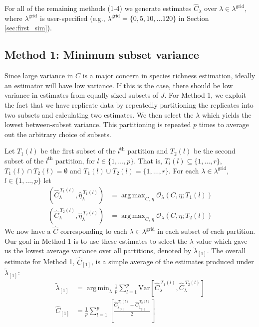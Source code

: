 \documentclass[12pt]{article}
\DeclareMathOperator*{\argmin}{arg\,min}
\DeclareMathOperator*{\argmax}{arg\,max}
\newcommand{\lambdagrid}{\lambda^{\text{grid}}}
\theoremstyle{break}
\theoremstyle{break}
\begin{document}
For all of the remaining methods (1-4) we generate estimates $\widehat{C}_\lambda$ over $\lambda \in \lambda^{\text{grid}}$, where $\lambdagrid$ is user-specified (e.g., $\lambdagrid = \{0, 5, 10, \dots 120\}$ in Section \ref{sec:first_sim}).  %

%
%
\subsection{Method 1: Minimum subset variance}

Since large variance in $C$ is a major concern in species richness estimation, ideally an estimator will have low variance. If this is the case, there should be low variance in estimates from equally sized subsets of $J$.
For Method 1, we exploit the fact that we have replicate data by repeatedly partitioning the replicates into two subsets and calculating two estimates.  We then select the $\lambda$ which yields the lowest between-subset variance.  This partitioning is repeated $p$ times to average out the arbitrary choice of subsets.


Let $T_1(l)$ be the first subset of the $l^{\text{th}}$ partition and $T_2(l)$ be the second subset of the $l^{\text{th}}$ partition, for $l \in \{1, \dots , p\}$. That is, $T_i(l) \subseteq \{1, \dots , r\}$, $T_1(l) \cap T_2(l) = \emptyset$ and $T_1(l) \cup T_2(l) = \{1, \dots ,r\}$.
For each $\lambda \in \lambda^{\text{grid}}$, $l \in \{1, \dots, p\}$ let
\begin{align}
\left(\widehat{C}_{\lambda}^{ \ T_1(l)}, \widehat{\eta}_{\lambda}^{ \ T_1(l)} \right) &= \argmax_{C, \, \eta} \mathcal{O}_\lambda \left(C, \eta; T_1(l) \right) \\
\left(\widehat{C}_{\lambda}^{ \ T_2(l)}, \widehat{\eta}_{\lambda}^{ \ T_2(l)} \right) &= \argmax_{C, \, \eta} \mathcal{O}_\lambda \left(C, \eta; T_2(l) \right)
\end{align}
We now have a $\widehat{C}$ corresponding to each $\lambda \in \lambdagrid$ in each subset of each partition.  Our goal in Method 1 is to use these estimates to select the $\lambda$ value which gave us the lowest average variance over all partitions, denoted by $\widetilde{\lambda}_{[1]}$.  The overall estimate for Method 1, $\widehat{C}_{[1]}$, is a simple average of the estimates produced under $\widetilde{\lambda}_{[1]}$:
\begin{align}
\widetilde{\lambda}_{[1]} &= \argmin_{\lambda} \frac{1}{p} \sum_{l=1}^p \text{Var}\left[ \widehat{C}_{\lambda}^{ \ T_1(l)}, \widehat{C}_{\lambda}^{ \ T_2(l)} \right] \\
\widehat{C}_{[1]} &=  \frac{1}{p} \sum_{l=1}^p \left[ \frac{\widehat{C}_{\widetilde{\lambda}_{[1]}}^{ \ T_1(l)} + \widehat{C}_{\widetilde{\lambda}_{[1]}}^{ \ T_2(l)}}{2} \right]
\end{align}
\end{document}
